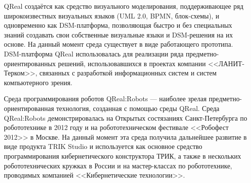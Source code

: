 QReal создаётся как средство визуального моделирования, поддерживающее ряд широкоизвестных 
визуальных языков (UML 2.0, BPMN, блок-схемы), и одновременно как DSM-платформа, 
позволяющая быстро и без специальных знаний создавать свои собственные 
визуальные языки и DSM-решения на их основе. На данный момент среда существует 
в виде работающего прототипа. DSM-платформа QReal использовалась
для реализации ряда предметно-ориентированных решений, использовавшихся в 
проектах компании <<ЛАНИТ-Терком>>, связанных с разработкой информационных систем 
и систем компьютерного зрения.

Среда программирования роботов QReal:Robots --- наиболее зрелая 
предметно-ориентированная технология, созданная с помощью среды QReal. Среда QReal:Robots 
демонстрировалась на Открытых состязаниях Санкт-Петербурга по робототехнике 
в 2012 году и на робототехническом фестивале <<Робофест 2012>> в Москве. На данный 
момент эта среда получила дальнейшее развитие в виде продукта TRIK Studio и используется 
как основное средство программирования кибернетического конструктора ТРИК, а также в 
нескольких робототехнических кружках в России и на мастер-классах по робототехнике, проводимых 
компанией <<Кибернетические технологии>>.

